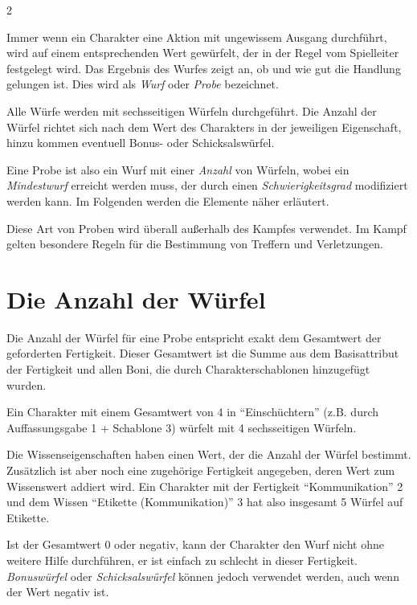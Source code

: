 \label{ch:rolls}

\begin{multicols}{2}

Immer wenn ein Charakter eine Aktion mit ungewissem Ausgang durchführt, wird auf einem entsprechenden Wert gewürfelt, der in der Regel vom Spielleiter festgelegt wird. Das Ergebnis des Wurfes zeigt an, ob und wie gut die Handlung gelungen ist. Dies wird als \textit{Wurf} oder \textit{Probe} bezeichnet.

Alle Würfe werden mit sechsseitigen Würfeln durchgeführt. Die Anzahl der Würfel richtet sich nach dem Wert des Charakters in der jeweiligen Eigenschaft, hinzu kommen eventuell Bonus- oder Schicksalswürfel.

Eine Probe ist also ein Wurf mit einer \textit{Anzahl} von Würfeln, wobei ein \textit{Mindestwurf} erreicht werden muss, der durch einen \textit{Schwierigkeitsgrad} modifiziert werden kann. Im Folgenden werden die Elemente näher erläutert.

Diese Art von Proben wird überall außerhalb des Kampfes verwendet. Im Kampf gelten besondere Regeln für die Bestimmung von Treffern und Verletzungen.

\section{Die Anzahl der Würfel}

Die Anzahl der Würfel für eine Probe entspricht exakt dem Gesamtwert der geforderten Fertigkeit. Dieser Gesamtwert ist die Summe aus dem Basisattribut der Fertigkeit und allen Boni, die durch Charakterschablonen hinzugefügt wurden.

\begin{pexample}[Beispiel]
Ein Charakter mit einem Gesamtwert von 4 in ``Einschüchtern'' (z.B. durch Auffassungsgabe 1 + Schablone 3) würfelt mit 4 sechsseitigen Würfeln.
\end{pexample}

Die Wissenseigenschaften haben einen Wert, der die Anzahl der Würfel bestimmt. Zusätzlich ist aber noch eine zugehörige Fertigkeit angegeben, deren Wert zum Wissenswert addiert wird. Ein Charakter mit der Fertigkeit ``Kommunikation'' 2 und dem Wissen ``Etikette (Kommunikation)'' 3 hat also insgesamt 5 Würfel auf Etikette.

Ist der Gesamtwert 0 oder negativ, kann der Charakter den Wurf nicht ohne weitere Hilfe durchführen, er ist einfach zu schlecht in dieser Fertigkeit. \textit{Bonuswürfel} oder \textit{Schicksalswürfel} können jedoch verwendet werden, auch wenn der Wert negativ ist.


\end{multicols}
